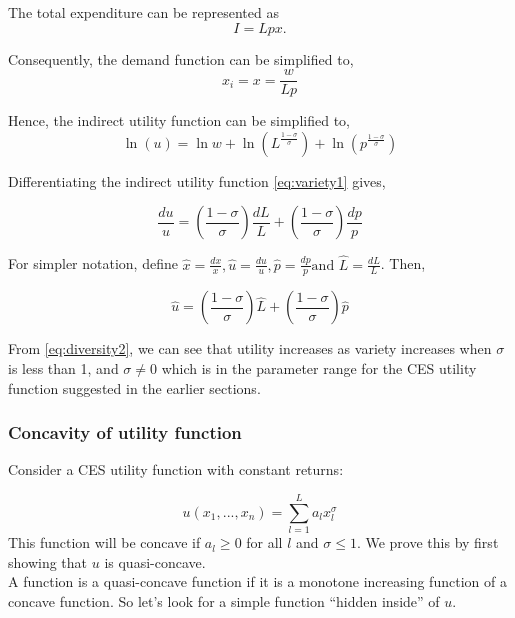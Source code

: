 The total expenditure can be represented as
\begin{equation}
I = Lpx.
\end{equation}

Consequently, the demand function can be simplified to,
\begin{equation}
x_{i} = x = \frac{w}{Lp}
\end{equation}

Hence, the indirect utility function can be simplified to,
\begin{equation}
\ln(u) = \ln w + \ln\left(L^{\frac{1-\sigma}{\sigma}}\right) +  \ln\left(p^{\frac{1-\sigma}{\sigma}}\right) \label{eq:variety1}
\end{equation}

Differentiating the indirect utility function \eqref{eq:variety1} gives,

\begin{equation}
\frac{du}{u}  = \left(\frac{1-\sigma}{\sigma}\right) \frac{dL}{L} + \left(\frac{1-\sigma}{\sigma}\right) \frac{dp}{p}
\end{equation}

For simpler notation, define $\hat{x} = \frac{dx}{x}, \hat{u} = \frac{du}{u},\hat{p} = \frac{dp}{p} \text{and } \hat{L} = \frac{dL}{L}$. Then,

\begin{equation}
\hat{u} = \left(\frac{1-\sigma}{\sigma}\right) \hat{L} + \left(\frac{1-\sigma}{\sigma}\right) \hat{p} \label{eq:diversity2}
\end{equation}

From \eqref{eq:diversity2}, we can see that utility increases as variety increases when $\sigma$ is less than 1, and $\sigma \neq 0$ which is in the parameter range for the CES utility function suggested in the earlier sections.
\subsubsection{Concavity of utility function}
Consider a CES utility function with constant returns:

\begin{equation}
u(x_{1},...,x_{n}) = \sum\limits_{l=1}^{L} a_{l} x_{l}^{\sigma}
\end{equation}
This function will be concave if $a_{l}\geq0$ for all $l$ and $\sigma\leq1$. We prove this by first showing that $u$ is quasi-concave. \\
A function is a quasi-concave function if it is a monotone increasing function of a concave function. So let's look for a simple function ``hidden inside'' of $u$.

